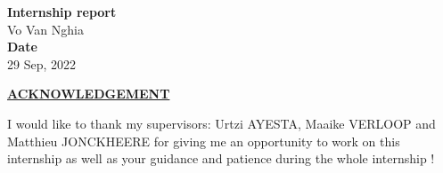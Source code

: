\onehalfspacing


\vspace*{\fill}
\begin{center}
  \Large{\textbf{Internship report}}\\
  \vspace*{1\baselineskip}
  Vo Van Nghia\\
  \vfill
  \vspace*{\fill}
  \Large{\textbf{Date}}\\
  29 Sep, 2022
\end{center}

\newpage

\newpage
{}
\renewcommand{\contentsname}{Table of contents}
\tableofcontents

\newpage

\begin{center}
  \underline{\textbf{ACKNOWLEDGEMENT}}
\end{center}
I would like to thank my supervisors: Urtzi AYESTA, Maaike VERLOOP and Matthieu JONCKHEERE for giving me an opportunity to work on this internship as well as your guidance and patience during the whole internship !

\newpage
{}
